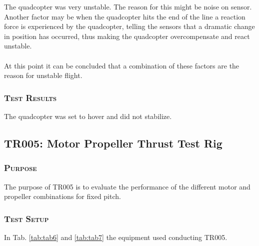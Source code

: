 The quadcopter was very unstable. The reason for this might be noise on sensor. Another factor may be when the quadcopter hits the end of the line a reaction force is experienced by the quadcopter, telling the sensors that a dramatic change in position has occurred, thus making the quadcopter overcompensate and react unstable. 
\\\\
At this point it can be concluded that a combination of these factors are the reason for unstable flight.

\subsubsection*{\textsc{\medium Test Results}}
The quadcopter was set to hover and did not stabilize.

\newpage

\subsection{TR005: Motor Propeller Thrust Test Rig}
         {}

\subsubsection*{\textsc{\medium Purpose}}
The purpose of TR005 is to evaluate the performance of the different motor and propeller combinations for fixed pitch. 

\subsubsection*{\textsc{\medium Test Setup}}
In Tab. \ref{tab:tab6} and \ref{tab:tab7} the equipment used conducting TR005.

